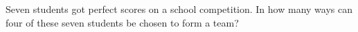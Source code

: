 Seven students got perfect scores on a school competition. In how many ways can four of these seven students be chosen to form a team?
